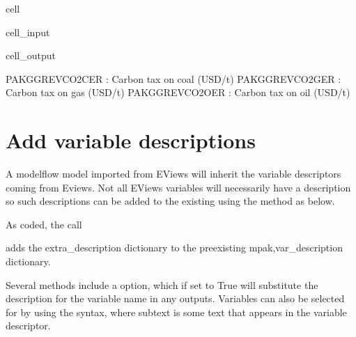 \documentclass[letterpaper,10pt,english]{jupyterBook}
\begin{document}
\begin{sphinxuseclass}{cell}\begin{sphinxVerbatimInput}

\begin{sphinxuseclass}{cell_input}
\begin{sphinxVerbatim}[commandchars=\\\{\}]
\PYG{p}{[}\PYG{p}{]}
\end{sphinxVerbatim}

\end{sphinxuseclass}\end{sphinxVerbatimInput}
\begin{sphinxVerbatimOutput}

\begin{sphinxuseclass}{cell_output}
\begin{sphinxVerbatim}[commandchars=\\\{\}]
PAKGGREVCO2CER : Carbon tax on coal (USD/t)
PAKGGREVCO2GER : Carbon tax on gas (USD/t)
PAKGGREVCO2OER : Carbon tax on oil (USD/t)
\end{sphinxVerbatim}

\end{sphinxuseclass}\end{sphinxVerbatimOutput}

\end{sphinxuseclass}

\section{Add variable descriptions}
\label{\detokenize{content/05_WBModels/MoreComplexScenarios:add-variable-descriptions}}
\sphinxAtStartPar
A modelflow model imported from EViews will inherit the variable descriptors coming from Eviews.  Not all EViews variables will necessarily have a description so such descriptions can be added to the existing using the \sphinxcode{\sphinxupquote{.set\_var\_descri{[}tion()}} method as below.

\sphinxAtStartPar
As coded, the call

\sphinxAtStartPar
{}

\sphinxAtStartPar
adds the extra\_description dictionary to the pre\sphinxhyphen{}existing mpak,var\_description dictionary.

\sphinxAtStartPar
Several  methods include a  option, which if set to True will substitute the description for the variable name in any outputs.  Variables can also be selected for by using the  syntax, where subtext is some text that appears in the variable descriptor.
\end{document}

